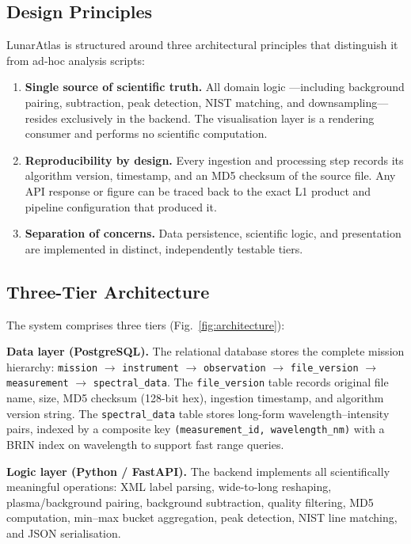 \documentclass[a4paper,twocolumn,10pt]{article}
\begin{document}
\subsection{Design Principles}

LunarAtlas is structured around three architectural principles that
distinguish it from ad-hoc analysis scripts:

\begin{enumerate}[nosep,leftmargin=*]
  \item \textbf{Single source of scientific truth.}  All domain logic
    ---including background pairing, subtraction, peak detection,
    NIST matching, and downsampling---resides exclusively in the
    backend.  The visualisation layer is a rendering consumer and
    performs no scientific computation.

  \item \textbf{Reproducibility by design.}  Every ingestion and
    processing step records its algorithm version, timestamp, and an
    MD5 checksum of the source file.  Any API response or figure can
    be traced back to the exact L1 product and pipeline configuration
    that produced it.

  \item \textbf{Separation of concerns.}  Data persistence, scientific
    logic, and presentation are implemented in distinct, independently
    testable tiers.
\end{enumerate}

\subsection{Three-Tier Architecture}

The system comprises three tiers (Fig.~\ref{fig:architecture}):

\textbf{Data layer (PostgreSQL).}  The relational database stores the
complete mission hierarchy:
\texttt{mission} $\rightarrow$ \texttt{instrument} $\rightarrow$
\texttt{observation} $\rightarrow$ \texttt{file\_version} $\rightarrow$
\texttt{measurement} $\rightarrow$ \texttt{spectral\_data}.
The \texttt{file\_version} table records original file name, size,
MD5 checksum (128-bit hex), ingestion timestamp, and algorithm version
string.  The \texttt{spectral\_data} table stores long-form
wavelength--intensity pairs, indexed by a composite key
\texttt{(measurement\_id, wavelength\_nm)} with a BRIN index on
wavelength to support fast range queries.

\textbf{Logic layer (Python / FastAPI).}  The backend implements all
scientifically meaningful operations: XML label parsing, wide-to-long
reshaping, plasma/background pairing, background subtraction, quality
filtering, MD5 computation, min--max bucket aggregation, peak
detection, NIST line matching, and JSON serialisation.
\end{document}
